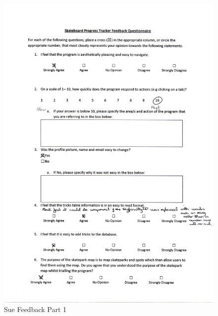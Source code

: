 \begin{figure}[H]
    \includegraphics[width=\textwidth]{./Evaluation/images/SueFeedback1.pdf}
    \caption{Sue Feedback Part 1} \label{fig:SueFeedback1}
\end{figure}

